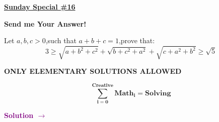\documentclass[12pt]{article}
\begin{document}
	

	\color{white}
	\begin{center}
		\thispagestyle{empty}
		
\vspace*{2cm}

		{\fontsize{40}{20}\selectfont\textbf{\underline{Sunday Special \#16}}}
		
		\vspace*{1cm}
		
		{\fontsize{35}{30}\selectfont\textbf{Send me Your Answer!}}
		\vspace*{1cm}
	\end{center}
	
	{\fontsize{30}{30}\selectfont Let $a,b,c>0$,such that $a+b+c=1$,prove that:$$3 \geq \sqrt{a+b^2+c^2}+\sqrt{b+c^2+a^2}+\sqrt{c+a^2+b^2} \geq \sqrt{5}$$}
	
	\vspace{1cm}
	\begin{center}	
		{\fontsize{30}{30}\textbf{ONLY ELEMENTARY SOLUTIONS ALLOWED}}
		
		\vspace{1cm}
		
		{\fontsize{50}{60}\selectfont 
			
			$$\boldsymbol{\sum \limits_{i=0}^{Creative} Math_i = Solving}$$}
		
		\vspace{1cm}
		
		\begin{mybox}\Huge{\begin{center}\textbf{\textcolor{Purple}{Solution $\to$}} \end{center}}\end{mybox}
	\end{center}
\end{document}
